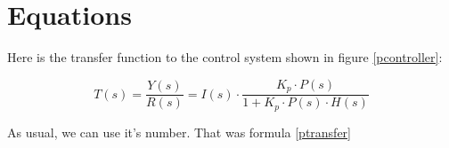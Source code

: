 \documentclass[twoside, 12pt]{article}
\begin{document}
	\section{Equations}

	Here is the transfer function to the control system shown in figure \ref{pcontroller}:

    \begin{equation}
        \label{ptransfer}
        T(s)=\frac{Y(s)}{R(s)}=I(s) \cdot \frac{K_p \cdot P(s)}{1 + K_p \cdot P(s) \cdot H(s)}
    \end{equation}

	As usual, we can use it's number. That was formula \eqref{ptransfer}
\end{document}
